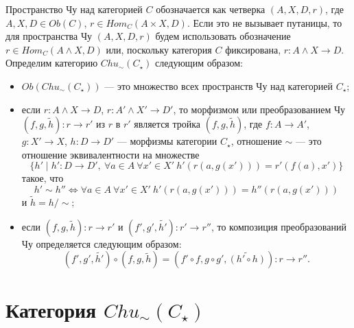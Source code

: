\documentclass[a4paper,12pt]{article}
\begin{document}
\begin{itemize}
    Пространство Чу над категорией $C$ обозначается как четверка $(A,X,D,r)$, где $A,X,D \in Ob(C)$, $r \in Hom_C(A \times X, D)$. Если это не вызывает путаницы, то для пространства Чу $(A,X,D,r)$ будем использовать обозначение $r \in Hom_C(A \wedge X,D)$ или, поскольку категория $C$ фиксирована, $r: A \wedge X \to D$. Определим категорию $Chu_\sim(C_\star)$ следующим образом:
    \begin{itemize}
        \item $Ob(Chu_\sim(C_\star))$ --- это множество всех пространств Чу над категорией $C_\star$;
        \item если $r: A \wedge X \to D$, $r: A' \wedge X' \to D'$, то морфизмом или преобразованием Чу $(f,g,\widetilde{h}): r \to r'$ из $r$ в $r'$ является тройка $(f,g,\widetilde{h})$, где $f: A \to A'$, $g: X' \to X$, $h: D \to D'$ --- морфизмы категории $C_\star$, отношение $\sim$ --- это отношение эквивалентности на множестве
        $$
            \{h' \mid h': D \to D',\ \forall a \in A\ \forall x' \in X'\ h'(r(a,g(x'))) = r'(f(a),x')\}
        $$
        такое, что
        $$
            h' \sim h'' \Leftrightarrow \forall a \in A\ \forall x' \in X'\ h'(r(a,g(x'))) = h''(r(a,g(x')))
        $$
        и $\widetilde{h} = h/\sim$;
        \item если $(f,g,\widetilde{h}): r \to r'$ и $(f',g',\widetilde{h'}): r' \to r''$, то композиция преобразований Чу определяется следующим образом:
        $$
            (f',g',\widetilde{h'}) \circ (f,g,\widetilde{h}) = (f' \circ f, g \circ g', \widetilde{(h' \circ h)}): r \to r''.
        $$
    \end{itemize}
\end{itemize}

\section*{Категория $Chu_\sim(C_\star)$}
\end{document}
